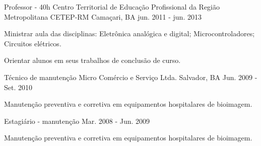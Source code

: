 \begin{cventries}
  \cventry
    {Professor - 40h} %
    {Centro Territorial de Educação Profissional da Região Metropolitana CETEP-RM} %
    {Camaçari, BA} %
    {jun. 2011 - jun. 2013} %
    {
      \begin{cvitems} %
        \item {Ministrar aula das disciplinas: Eletrônica analógica e digital; Microcontroladores; Circuitos elétricos.}
        \item {Orientar alunos em seus trabalhos de conclusão de curso.}
      \end{cvitems}
    }
    
    
  \cventry
    {Técnico de manutenção} %
    {Micro Comércio e Serviço Ltda.} %
    {Salvador, BA} %
    {Jun. 2009 - Set. 2010} %
    {
      \begin{cvitems} %
        \item {Manutenção preventiva e corretiva em equipamentos hospitalares de bioimagem.}
      \end{cvitems}
    }

  \cventry
    {Estagiário - manutenção} %
    {} %
    {} %
    {Mar. 2008 - Jun. 2009} %
    {
      \begin{cvitems} %
        \item {Manutenção preventiva e corretiva em equipamentos hospitalares de bioimagem.}
      \end{cvitems}
    }


\end{cventries}
